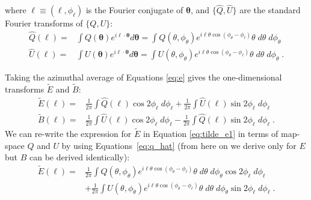 where $\boldsymbol{\ell} \equiv (\ell,\phi_\ell)$ is the Fourier conjugate of $\boldsymbol{\theta}$, and $\{\hat{Q},\hat{U}\}$ are the standard Fourier transforms of $\{Q,U\}$:
\begin{equation} \label{eq:q_hat}
\begin{split}
        \hat{Q}(\boldsymbol{\ell}) =& \int Q(\boldsymbol{\theta}) e^{i\boldsymbol{\ell}\cdot\boldsymbol{\theta}} d\boldsymbol{\theta} = \int Q(\theta,\phi_{\theta}) e^{i\ell\theta\cos(\phi_{\theta} - \phi_\ell)} \theta\; d\theta\; d\phi_{\theta} \\
        \hat{U}(\boldsymbol{\ell}) =& \int U(\boldsymbol{\theta}) e^{i\boldsymbol{\ell}\cdot\boldsymbol{\theta}} d\boldsymbol{\theta} = \int U(\theta,\phi_{\theta}) e^{i\ell\theta\cos(\phi_{\theta} - \phi_{\ell})} \theta\; d\theta\; d\phi_{\theta} \; .
\end{split}
\end{equation}

Taking the azimuthal average of Equations \ref{eq:e} gives the one-dimensional transforms $\tilde{E}$ and $\tilde{B}$:
\begin{equation} \label{eq:tilde_e1}
\begin{split}
    \tilde{E}(\ell) =& \frac{1}{2\pi} \int \hat{Q}(\boldsymbol{\ell}) \cos 2\phi_{\ell}\;d\phi_{\ell} + \frac{1}{2\pi} \int \hat{U}(\boldsymbol{\ell}) \sin 2\phi_{\ell}\;d\phi_{\ell}   \\
    \tilde{B}(\ell) =& \frac{1}{2\pi} \int \hat{U}(\boldsymbol{\ell}) \cos 2\phi_{\ell}\;d\phi_{\ell} - \frac{1}{2\pi} \int \hat{Q}(\boldsymbol{\ell}) \sin 2\phi_{\ell}\;d\phi_{\ell} \; .    
\end{split}
\end{equation}
We can re-write the expression for $\tilde{E}$ in Equation \ref{eq:tilde_e1} in terms of map-space $Q$ and $U$ by using Equations~\ref{eq:q_hat} (from here on we derive only for $E$ but $B$ can be derived identically):
\begin{equation} \label{eq:tilde_e2}
\begin{split}
        \tilde{E}(\ell) = & \frac{1}{2\pi} \int Q(\theta,\phi_{\theta}) e^{i\ell\theta\cos(\phi_{\theta} - \phi_{\ell})} \theta\;d\theta\;d\phi_{\theta} \cos 2\phi_{\ell}\;d\phi_{\ell} \\ &
    + \frac{1}{2\pi} \int U(\theta,\phi_{\theta}) e^{i\ell\theta\cos(\phi_{\theta} - \phi_{\ell})} \theta\;d\theta\;d\phi_{\theta} \sin 2\phi_{\ell}\;d\phi_{\ell} \; .
\end{split}
\end{equation}

